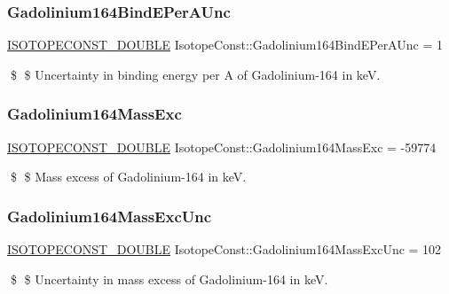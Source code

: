 \subsubsection{\texorpdfstring{Gadolinium164\+Bind\+E\+Per\+A\+Unc}{Gadolinium164BindEPerAUnc}}
{\footnotesize\ttfamily \mbox{\hyperlink{group___isotope_const-_macros_ga8f45a7272ce02c0b4c65c44636ed719a}{I\+S\+O\+T\+O\+P\+E\+C\+O\+N\+S\+T\+\_\+\+D\+O\+U\+B\+LE}} Isotope\+Const\+::\+Gadolinium164\+Bind\+E\+Per\+A\+Unc = 1}

\$ \$ Uncertainty in binding energy per A of Gadolinium-\/164 in keV. \mbox{\label{group___isotope_const-_gadolinium-_gd164_gaf66f3c3d7a3893f4efc839efea727d9b}} 
\subsubsection{\texorpdfstring{Gadolinium164\+Mass\+Exc}{Gadolinium164MassExc}}
{\footnotesize\ttfamily \mbox{\hyperlink{group___isotope_const-_macros_ga8f45a7272ce02c0b4c65c44636ed719a}{I\+S\+O\+T\+O\+P\+E\+C\+O\+N\+S\+T\+\_\+\+D\+O\+U\+B\+LE}} Isotope\+Const\+::\+Gadolinium164\+Mass\+Exc = -\/59774}

\$ \$ Mass excess of Gadolinium-\/164 in keV. \mbox{\label{group___isotope_const-_gadolinium-_gd164_ga14234b987f25b096fd36524bfac5066d}} 
\subsubsection{\texorpdfstring{Gadolinium164\+Mass\+Exc\+Unc}{Gadolinium164MassExcUnc}}
{\footnotesize\ttfamily \mbox{\hyperlink{group___isotope_const-_macros_ga8f45a7272ce02c0b4c65c44636ed719a}{I\+S\+O\+T\+O\+P\+E\+C\+O\+N\+S\+T\+\_\+\+D\+O\+U\+B\+LE}} Isotope\+Const\+::\+Gadolinium164\+Mass\+Exc\+Unc = 102}

\$ \$ Uncertainty in mass excess of Gadolinium-\/164 in keV. \mbox{\label{group___isotope_const-_gadolinium-_gd164_ga00834124d3a0f0e3a585cb8b35ff6942}} 
